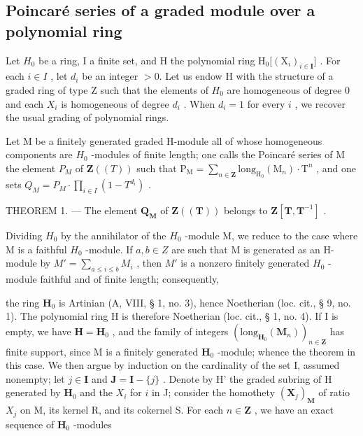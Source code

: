 \subsection{Poincaré series of a graded module over a polynomial ring}

Let \(H_{0}\) be a ring, I a finite set, and H the polynomial ring \(\mathrm{H}_{0}\big[(\mathrm{X}_{i})_{i\in\mathbf{I}}\big]\) . For each \(i\in I\) , let \(d_{i}\) be an integer \(>0\). Let us endow H with the structure of a graded ring of type Z such that the elements of \(H_{0}\) are homogeneous of degree 0 and each \(X_{i}\) is homogeneous of degree \(d_{i}\) . When \(d_{i}=1\) for every \(i\) , we recover the usual grading of polynomial rings.

Let M be a finitely generated graded H-module all of whose homogeneous components are \(H_{0}\) -modules of finite length; one calls the Poincaré series of M the element \(P_{M}\) of \(\mathbf{Z}((T))\) such that \(\mathrm{P}_{\mathrm{M}} = \sum_{n \in \mathbf{Z}} \mathrm{long}_{\mathrm{H}_{0}}(\mathrm{M}_{n}) \cdot \mathrm{T}^{n}\) , and one sets \(Q_{M} = P_{M} \cdot \prod_{i \in I} (1 - T^{d_{i}})\) .

THEOREM 1. --- The element \(\mathbf{Q}_{\mathbf{M}}\) of \(\mathbf{Z}((\mathbf{T}))\) belongs to \(\mathbf{Z}[\mathbf{T}, \mathbf{T}^{-1}]\) .

Dividing \(H_{0}\) by the annihilator of the \(H_{0}\) -module M, we reduce to the case where M is a faithful \(H_{0}\) -module. If \(a, b \in Z\) are such that M is generated as an H-module by \(M' = \sum_{a \leqslant i \leqslant b} M_{i}\) , then \(M'\) is a nonzero finitely generated \(H_{0}\) -module faithful and of finite length; consequently,

the ring \(\mathbf{H}_0\) is Artinian (A, VIII, § 1, no. 3), hence Noetherian (loc. cit., § 9, no. 1). The polynomial ring H is therefore Noetherian (loc. cit., § 1, no. 4). If I is empty, we have \(\mathbf{H} = \mathbf{H}_0\) , and the family of integers \((\mathrm{long}_{\mathbf{H}_0}(\mathbf{M}_n))_{n \in \mathbf{Z}}\) has finite support, since M is a finitely generated \(\mathbf{H}_0\) -module; whence the theorem in this case. We then argue by induction on the cardinality of the set I, assumed nonempty; let \(j \in \mathbf{I}\) and \(\mathbf{J} = \mathbf{I} - \{j\}\) . Denote by H' the graded subring of H generated by \(\mathbf{H}_0\) and the \(X_i\) for \(i\) in J; consider the homothety \((\mathbf{X}_j)_\mathbf{M}\) of ratio \(X_j\) on M, its kernel R, and its cokernel S. For each \(n \in \mathbf{Z}\) , we have an exact sequence of \(\mathbf{H}_0\) -modules

